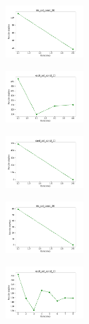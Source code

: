 \newpage

\begin{figure}[H]
    \centering
    \begin{subfigure}
        \centering
        \includegraphics[width=0.32\textwidth]{img/copkm/iris_set_const_20_949004259_cost.png}
    \end{subfigure}
    \hfill
    \begin{subfigure}
        \centering
        \includegraphics[width=0.32\textwidth]{img/copkm/ecoli_set_const_20_949004259_cost.png}
    \end{subfigure}
    \hfill
    \begin{subfigure}
        \centering
        \includegraphics[width=0.32\textwidth]{img/copkm/rand_set_const_20_949004259_cost.png}
    \end{subfigure}
    \hfill
    \begin{subfigure}
        \centering
        \includegraphics[width=0.32\textwidth]{img/copkm/iris_set_const_20_589741062_cost.png}
    \end{subfigure}
    \hfill
    \begin{subfigure}
        \centering
        \includegraphics[width=0.32\textwidth]{img/copkm/ecoli_set_const_20_589741062_cost.png}

\end{subfigure}
\end{figure}
